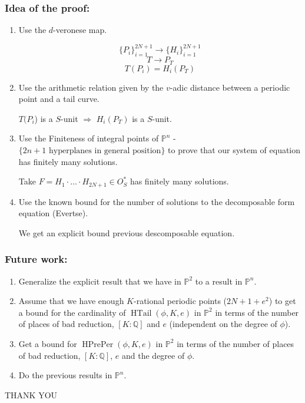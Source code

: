 \documentclass{beamer}
\def\PP{{\mathbb P}}
\def\QQ{{\mathbb Q}}
\DeclareMathOperator{\HTail}{HTail}
\DeclareMathOperator{\HPrePer}{HPrePer}
\theoremstyle{thmstyle}
\theoremstyle{thmstyle}
\theoremstyle{mystyle}
\theoremstyle{qstnstyle}
\begin{document}
\begin{frame}
\frametitle{Idea of the proof:}
\begin{enumerate}
\item Use the $d$-veronese map.

 
$$\{P_i\}_{i=1}^{2N+1} \rightarrow \{H_i\}_{i=1}^{2N+1}$$
$$T  \rightarrow P_T$$
$$T(P_i)=H_i(P_T) $$

 

\item Use the arithmetic relation given by the $v$-adic distance between a periodic point and a tail curve.

 
$T(P_i$) is a $S$-unit $\Rightarrow$  $H_i(P_T)$ is a $S$-unit.

 

\item Use the Finiteness of integral points of $\PP^n$ - $\{2n+1 \mbox{ hyperplanes in general position}\}$ to prove that our system of equation has finitely many solutions.

 
Take $F=H_1 \cdot\ldots\cdot H_{2N+1} \in O_S^{*}$ has finitely many solutions.

 

\item Use the known bound for the number of solutions to the decomposable form equation (Evertse).

 
We get an explicit bound previous descomposable equation.
\end{enumerate}
\end{frame}



\begin{frame}
\frametitle{Future work:}
\begin{enumerate}
\item Generalize the explicit result that we have in $\PP^2$ to a result in $\PP^n$. 

\vspace{6mm}  


\item Assume that we have enough $K$-rational periodic points ($2N+1+e^2$) to get a bound for the cardinality of $\HTail(\phi,K, e)$ in $\PP^2$ in terms of the number of places of bad reduction, $[K:\QQ]$ and $e$ (independent on the degree of $\phi$).


\vspace{6mm}  


\item Get a bound for  $\HPrePer(\phi,K, e)$ in $\PP^2$ in terms of the number of places of bad reduction, $[K:\QQ]$, $e$ and the degree of $\phi$.

\vspace{6mm}  

\item Do the previous results in $\PP^n$.


\end{enumerate}


\end{frame}






\begin{frame}
\Huge{THANK YOU}
\end{frame}
\end{document}
